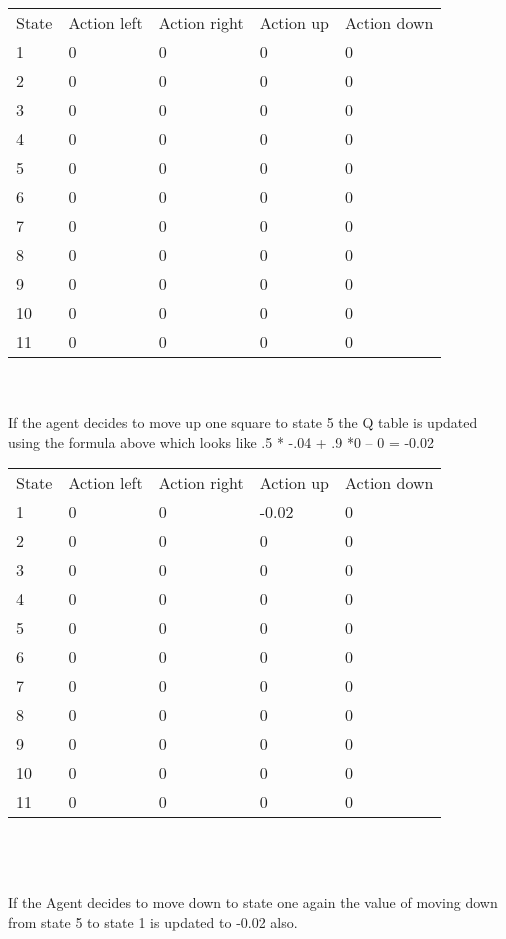 	\begin{tabular}{lllll}
		State & Action left & Action right & Action up & Action down \\
		1     & 0           & 0            & 0         & 0           \\
		2     & 0           & 0            & 0         & 0           \\
		3     & 0           & 0            & 0         & 0           \\
		4     & 0           & 0            & 0         & 0           \\
		5     & 0           & 0            & 0         & 0           \\
		6     & 0           & 0            & 0         & 0           \\
		7     & 0           & 0            & 0         & 0           \\
		8     & 0           & 0            & 0         & 0           \\
		9     & 0           & 0            & 0         & 0           \\
		10    & 0           & 0            & 0         & 0           \\
		11    & 0           & 0            & 0         & 0          
	\end{tabular}
\\
\\
If the agent decides to move up one square to state 5 the Q table is updated using the formula above which looks like   .5 * -.04  + .9 *0 – 0 = -0.02

	\begin{tabular}{lllll}
		State & Action left & Action right & Action up & Action down \\
		1     & 0           & 0            & -0.02     & 0           \\
		2     & 0           & 0            & 0         & 0           \\
		3     & 0           & 0            & 0         & 0           \\
		4     & 0           & 0            & 0         & 0           \\
		5     & 0           & 0            & 0         & 0           \\
		6     & 0           & 0            & 0         & 0           \\
		7     & 0           & 0            & 0         & 0           \\
		8     & 0           & 0            & 0         & 0           \\
		9     & 0           & 0            & 0         & 0           \\
		10    & 0           & 0            & 0         & 0           \\
		11    & 0           & 0            & 0         & 0          
	\end{tabular}
\\
\\
\\
If the Agent decides to move down to state one again the value of moving down from state 5 to state 1 is updated to -0.02 also.
\\

